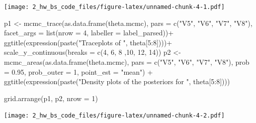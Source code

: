 \documentclass[
  11pt,
]{article}
\newenvironment{Shaded}{\begin{snugshade}}{\end{snugshade}}
\newcommand{\AttributeTok}[1]{\textcolor[rgb]{0.77,0.63,0.00}{#1}}
\newcommand{\DecValTok}[1]{\textcolor[rgb]{0.00,0.00,0.81}{#1}}
\newcommand{\FloatTok}[1]{\textcolor[rgb]{0.00,0.00,0.81}{#1}}
\newcommand{\FunctionTok}[1]{\textcolor[rgb]{0.00,0.00,0.00}{#1}}
\newcommand{\NormalTok}[1]{#1}
\newcommand{\OtherTok}[1]{\textcolor[rgb]{0.56,0.35,0.01}{#1}}
\newcommand{\SpecialCharTok}[1]{\textcolor[rgb]{0.00,0.00,0.00}{#1}}
\newcommand{\StringTok}[1]{\textcolor[rgb]{0.31,0.60,0.02}{#1}}
\begin{document}
\texttt{[image: 2\_hw\_bs\_code\_files/figure-latex/unnamed-chunk-4-1.pdf]}

\begin{Shaded}
\begin{Highlighting}[]
\NormalTok{p1 }\OtherTok{\textless{}{-}} \FunctionTok{mcmc\_trace}\NormalTok{(}\FunctionTok{as.data.frame}\NormalTok{(theta.mcmc), }\AttributeTok{pars =} \FunctionTok{c}\NormalTok{(}\StringTok{"V5"}\NormalTok{, }\StringTok{"V6"}\NormalTok{, }\StringTok{"V7"}\NormalTok{, }\StringTok{"V8"}\NormalTok{), }\AttributeTok{facet\_args =} \FunctionTok{list}\NormalTok{(}\AttributeTok{nrow =} \DecValTok{4}\NormalTok{, }\AttributeTok{labeller =}\NormalTok{ label\_parsed))}\SpecialCharTok{+}
  \FunctionTok{ggtitle}\NormalTok{(}\FunctionTok{expression}\NormalTok{(}\FunctionTok{paste}\NormalTok{(}\StringTok{"Traceplots of "}\NormalTok{, theta[}\DecValTok{5}\SpecialCharTok{:}\DecValTok{8}\NormalTok{])))}\SpecialCharTok{+}
  \FunctionTok{scale\_y\_continuous}\NormalTok{(}\AttributeTok{breaks =} \FunctionTok{c}\NormalTok{(}\DecValTok{4}\NormalTok{, }\DecValTok{6}\NormalTok{, }\DecValTok{8}\NormalTok{ ,}\DecValTok{10}\NormalTok{, }\DecValTok{12}\NormalTok{, }\DecValTok{14}\NormalTok{))}
\NormalTok{p2 }\OtherTok{\textless{}{-}} \FunctionTok{mcmc\_areas}\NormalTok{(}\FunctionTok{as.data.frame}\NormalTok{(theta.mcmc), }\AttributeTok{pars =} \FunctionTok{c}\NormalTok{(}\StringTok{"V5"}\NormalTok{, }\StringTok{"V6"}\NormalTok{, }\StringTok{"V7"}\NormalTok{, }\StringTok{"V8"}\NormalTok{), }\AttributeTok{prob =} \FloatTok{0.95}\NormalTok{, }
  \AttributeTok{prob\_outer =} \DecValTok{1}\NormalTok{,}
  \AttributeTok{point\_est =} \StringTok{"mean"}\NormalTok{) }\SpecialCharTok{+}
  \FunctionTok{ggtitle}\NormalTok{(}\FunctionTok{expression}\NormalTok{(}\FunctionTok{paste}\NormalTok{(}\StringTok{"Density plots of the posteriors for "}\NormalTok{, theta[}\DecValTok{5}\SpecialCharTok{:}\DecValTok{8}\NormalTok{])))}

\FunctionTok{grid.arrange}\NormalTok{(p1, p2, }\AttributeTok{nrow =} \DecValTok{1}\NormalTok{)}
\end{Highlighting}
\end{Shaded}

\texttt{[image: 2\_hw\_bs\_code\_files/figure-latex/unnamed-chunk-4-2.pdf]}
\end{document}
